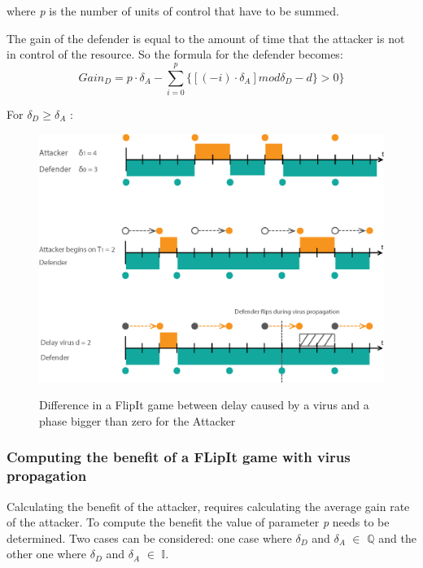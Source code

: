 where \textit{p} is the number of units of control that have to be summed.  

The gain of the defender is equal to the amount of time that the attacker is not in control of the resource. So the formula for the defender becomes:
\begin{equation}\label{first}
Gain_{D} = p \cdot \delta_{A}  -  \sum_{i=0}^{p} \lbrace [( - i ) \cdot \delta_{A}] mod \delta_{D} - d \rbrace  > 0 \rbrace 
\end{equation}

For $\delta_{D} \geq \delta_{A}$ :

\begin{figure}[hbtp]
\caption{Difference in a FlipIt game between delay caused by a virus and a phase bigger than zero for the Attacker}
\centering
\includegraphics[scale=1]{Images/Flipvirus}
\label{fig:virusflip}
\end{figure}


\subsubsection{Computing the benefit of a FLipIt game with virus propagation}

Calculating the benefit of the attacker, requires calculating the average gain rate of the attacker. To compute the benefit the value of parameter \textit{p} needs to be determined. Two cases can be considered: one case where $\delta_{D}$ and $\delta_{A}$ $\in$ \(\mathbb{Q}\) and the other one where $\delta_{D}$ and $\delta_{A}$ $\in$ \(\mathbb{I}.\) \\

